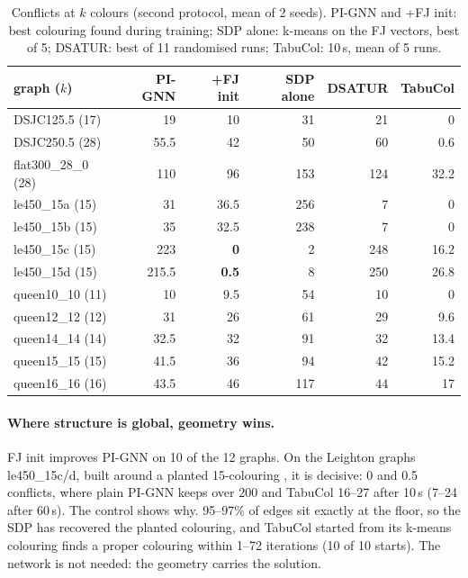 \documentclass[11pt]{article}
\begin{document}
\begin{table}[htbp]
\centering\small
\begin{tabular}{@{}lrrrrr@{}}
\toprule
graph ($k$) & PI-GNN & +FJ init & SDP alone & DSATUR & TabuCol \\
\midrule
DSJC125.5 (17) & 19 & 10 & 31 & 21 & 0 \\
DSJC250.5 (28) & 55.5 & 42 & 50 & 60 & 0.6 \\
flat300\_28\_0 (28) & 110 & 96 & 153 & 124 & 32.2 \\
le450\_15a (15) & 31 & 36.5 & 256 & 7 & 0 \\
le450\_15b (15) & 35 & 32.5 & 238 & 7 & 0 \\
le450\_15c (15) & 223 & \textbf{0} & 2 & 248 & 16.2 \\
le450\_15d (15) & 215.5 & \textbf{0.5} & 8 & 250 & 26.8 \\
queen10\_10 (11) & 10 & 9.5 & 54 & 10 & 0 \\
queen12\_12 (12) & 31 & 26 & 61 & 29 & 9.6 \\
queen14\_14 (14) & 32.5 & 32 & 91 & 32 & 13.4 \\
queen15\_15 (15) & 41.5 & 36 & 94 & 42 & 15.2 \\
queen16\_16 (16) & 43.5 & 46 & 117 & 44 & 17 \\
\bottomrule
\end{tabular}
\caption{Conflicts at $k$ colours (second protocol, mean of 2 seeds). PI-GNN
and +FJ init: best colouring found during training; SDP alone: k-means on the
FJ vectors, best of 5; DSATUR: best of 11 randomised runs; TabuCol: 10\,s, mean
of 5 runs.}
\label{tab:sdp}
\end{table}

\paragraph{Where structure is global, geometry wins.} FJ init improves PI-GNN
on 10 of the 12 graphs. On the Leighton graphs le450\_15c/d, built around a
planted 15-colouring \citep{leighton1979}, it is decisive: 0 and 0.5 conflicts,
where plain PI-GNN keeps over 200 and TabuCol 16--27 after 10\,s (7--24 after
60\,s). The control shows why. 95--97\% of edges sit exactly at the floor, so
the SDP has recovered the planted colouring, and TabuCol started from its
k-means colouring finds a proper colouring within 1--72 iterations (10 of 10
starts). The network is not needed: the geometry carries the solution.
\end{document}

